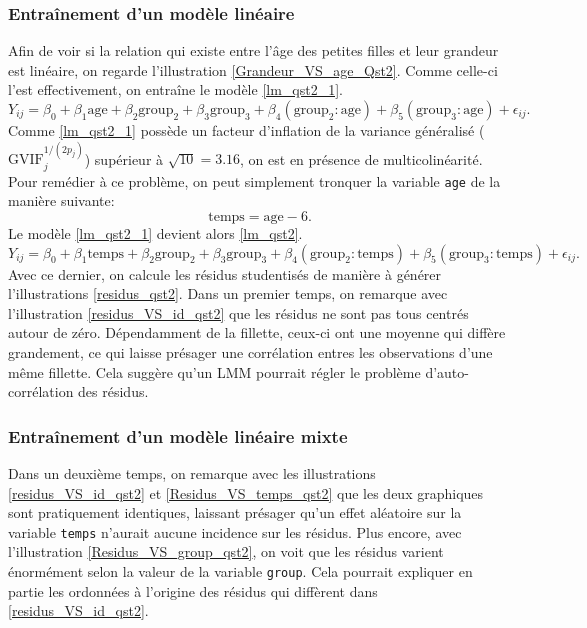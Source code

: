 \documentclass{article}
\begin{document}
	\subsubsection*{Entraînement d'un modèle linéaire}
		Afin de voir si la relation qui existe entre l'âge des petites filles et leur grandeur est linéaire, on regarde l'illustration \ref{Grandeur_VS_age_Qst2}. Comme celle-ci l'est effectivement, on entraîne le modèle \eqref{lm_qst2_1}.
		\begin{equation}\label{lm_qst2_1}
			Y_{ij} = \beta_0 + \beta_1 \mathrm{age} + \beta_2 \mathrm{group_2} + \beta_3 \mathrm{group_3} + \beta_4 (\mathrm{group_2:age}) + \beta_5 (\mathrm{group_3:age}) + \epsilon_{ij}.
		\end{equation}
		Comme \eqref{lm_qst2_1} possède un facteur d'inflation de la variance généralisé ($\mathrm{GVIF}_j^{1/(2p_j)}$) supérieur à $\sqrt{10} = 3.16$, on est en présence de multicolinéarité. Pour remédier à ce problème, on peut simplement tronquer la variable \texttt{age} de la manière suivante:
		$$\mathrm{temps}=\mathrm{age}-6.$$
		Le modèle \eqref{lm_qst2_1} devient alors \eqref{lm_qst2}.
		\begin{equation}\label{lm_qst2}
			Y_{ij} = \beta_0 + \beta_1 \mathrm{temps} + \beta_2 \mathrm{group_2} + \beta_3 \mathrm{group_3} + \beta_4 (\mathrm{group_2:temps}) + \beta_5 (\mathrm{group_3:temps}) + \epsilon_{ij}.
		\end{equation}
		Avec ce dernier, on calcule les résidus studentisés de manière à générer l'illustrations \ref{residus_qst2}. Dans un premier temps, on remarque avec l'illustration \ref{residus_VS_id_qst2} que les résidus ne sont pas tous centrés autour de zéro. Dépendamment de la fillette, ceux-ci ont une moyenne qui diffère grandement, ce qui laisse présager une corrélation entres les observations d'une même fillette. Cela suggère qu'un LMM pourrait régler le problème d'auto-corrélation des résidus.
		
		\subsubsection*{Entraînement d'un modèle linéaire mixte}
		Dans un deuxième temps, on remarque avec les illustrations \ref{residus_VS_id_qst2} et \ref{Residus_VS_temps_qst2} que les deux graphiques sont pratiquement identiques, laissant présager qu'un effet aléatoire sur la variable \texttt{temps} n'aurait aucune incidence sur les résidus. Plus encore, avec l'illustration \ref{Residus_VS_group_qst2}, on voit que les résidus varient énormément selon la valeur de la variable \texttt{group}. Cela pourrait expliquer en partie les ordonnées à l'origine des résidus qui diffèrent dans \ref{residus_VS_id_qst2}.\\		
	
\end{document}
